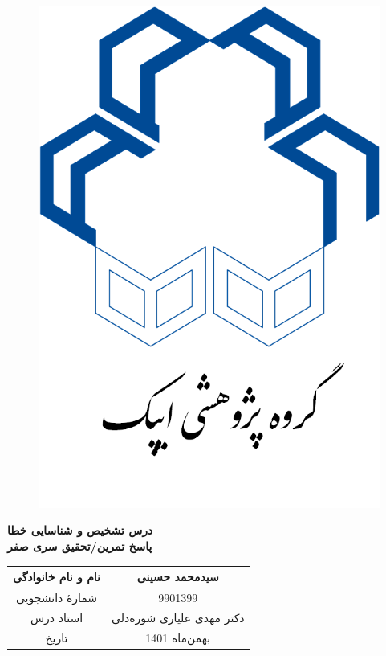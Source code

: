 \begin{titlepage}
\begin{center}

  \begin{figure}[h!]
 	\centering
 	\subfigure
 	{
 		\includegraphics[width=0.33\columnwidth, height=0.45\columnwidth]{Fault}
 		\label{fig:FD3Msav43i22ngCdW2}
 	}
 \end{figure}
 
 
\vfill
        
\Huge
\textbf{درس تشخیص و شناسایی خطا}\\
\textbf{پاسخ تمرین/تحقیق سری صفر}\\
        
\vfill
        
\begin{table}[ht]
    \centering
    \huge
    \begin{tabular}{|c|c|}
    \hline
    نام و نام خانوادگی & سیدمحمد حسینی\\
    \hline
    شمارۀ دانشجویی & 9901399\\
    \hline
    استاد درس & دکتر مهدی علیاری شوره‌دلی\\
    \hline
    تاریخ & بهمن‌ماه 1401\\
    \hline
    \end{tabular}
\end{table}
\end{center}
\end{titlepage}
